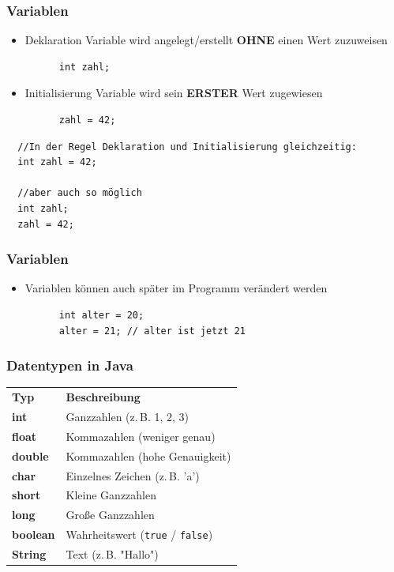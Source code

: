 \documentclass{../../presentation}
\begin{document}
\begin{frame}[fragile]
  \frametitle{Variablen}
  \begin{itemize}
    \item Deklaration \quad \textrightarrow \quad Variable wird angelegt/erstellt \textbf{OHNE} einen Wert zuzuweisen
          \begin{verbatim}
      int zahl;
    \end{verbatim}
          \pause
    \item Initialisierung \quad \textrightarrow \quad Variable wird sein \textbf{ERSTER} Wert zugewiesen
          \begin{verbatim}
      zahl = 42;
    \end{verbatim}
          \pause
  \end{itemize}
  \begin{verbatim}
  //In der Regel Deklaration und Initialisierung gleichzeitig:
  int zahl = 42;

  //aber auch so möglich
  int zahl;
  zahl = 42;
  \end{verbatim}
\end{frame}

\begin{frame}[fragile]
  \frametitle{Variablen}
  \begin{itemize}
    \item Variablen können auch später im Programm verändert werden
          \begin{verbatim}
      int alter = 20;
      alter = 21; // alter ist jetzt 21
    \end{verbatim}
  \end{itemize}
\end{frame}


\begin{frame}
  \frametitle{Datentypen in Java}
  \centering
  \begin{tabular}{>{\bfseries}l l}
    \rowcolor{tablehead}
    Typ     & \textbf{Beschreibung}                          \\
    int     & Ganzzahlen (z.\,B. 1, 2, 3)                    \\
    float   & Kommazahlen (weniger genau)                    \\
    double  & Kommazahlen (hohe Genauigkeit)                 \\
    char    & Einzelnes Zeichen (z.\,B. 'a')                 \\
    short   & Kleine Ganzzahlen                              \\
    long    & Große Ganzzahlen                               \\
    boolean & Wahrheitswert (\texttt{true} / \texttt{false}) \\
    String  & Text (z.\,B. "Hallo")                          \\
  \end{tabular}
\end{frame}
\end{document}
